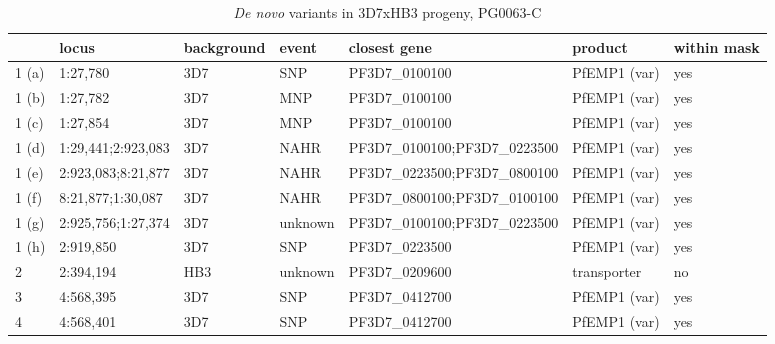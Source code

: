 \begin{landscape}
\begin{table}[]
\centering
\caption{\textit{De novo} variants in 3D7xHB3 progeny, PG0063-C}
\label{tbl:callsPG0063C}
\begin{tabular}{@{}lllllll@{}}
\toprule
       & locus                & background &  event    &  closest gene                   &  product           &  within mask  \\
\midrule
1 (a)  & 1:27,780             & 3D7        &  SNP      &  PF3D7\_0100100                 &  PfEMP1 (var)       & yes          \\
1 (b)  & 1:27,782             & 3D7        &  MNP      &  PF3D7\_0100100                 &  PfEMP1 (var)       & yes          \\
1 (c)  & 1:27,854             & 3D7        &  MNP      &  PF3D7\_0100100                 &  PfEMP1 (var)       & yes          \\
1 (d)  & 1:29,441;2:923,083   & 3D7        &  NAHR     &  PF3D7\_0100100;PF3D7\_0223500  &  PfEMP1 (var)       & yes          \\
1 (e)  & 2:923,083;8:21,877   & 3D7        &  NAHR     &  PF3D7\_0223500;PF3D7\_0800100  &  PfEMP1 (var)       & yes          \\
1 (f)  & 8:21,877;1:30,087    & 3D7        &  NAHR     &  PF3D7\_0800100;PF3D7\_0100100  &  PfEMP1 (var)       & yes          \\
1 (g)  & 2:925,756;1:27,374   & 3D7        &  unknown  &  PF3D7\_0100100;PF3D7\_0223500  &  PfEMP1 (var)       & yes          \\
1 (h)  & 2:919,850            & 3D7        &  SNP      &  PF3D7\_0223500                 &  PfEMP1 (var)       & yes          \\
2      & 2:394,194            & HB3        &  unknown  &  PF3D7\_0209600                 &  transporter        & no           \\
3      & 4:568,395            & 3D7        &  SNP      &  PF3D7\_0412700                 &  PfEMP1 (var)       & yes          \\
4      & 4:568,401            & 3D7        &  SNP      &  PF3D7\_0412700                 &  PfEMP1 (var)       & yes          \\
\bottomrule
\end{tabular}
\end{table}
\end{landscape}

